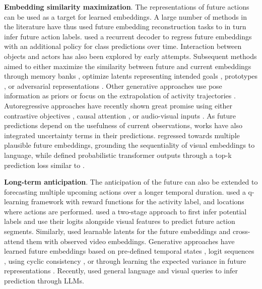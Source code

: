 \documentclass[smallextended,twocolumn,natbib]{svjour3}
\begin{document}
\noindent
\textbf{Embedding similarity maximization}. The representations of future actions can be used as a target for learned embeddings. A large number of methods in the literature have thus used future embedding reconstruction tasks to in turn infer future action labels. \citet{gao2017red} used a recurrent decoder to regress future embeddings with an additional policy for class predictions over time. Interaction between objects and actors \citep{sun2019relational,luc2018predicting} has also been explored by early attempts. 
Subsequent methods aimed to either maximize the similarity between future and current embeddings through memory banks \citep{liu2022hybrid},
optimize latents representing intended goals \citep{roy2022action}, prototypes \citep{diko2024semantically}, or adversarial representations \citep{gammulle2019predicting}. Other generative approaches use pose information as priors \citep{villegas2017learning} or focus on the extrapolation of activity trajectories \citep{chi2023adamsformer}.
Autoregressive approaches have recently shown great promise using either contrastive objectives \citep{wu2020learning}, causal attention \citep{girdhar2021anticipative}, or audio-visual inputs \citep{zhong2023anticipative}. As future predictions depend on the usefulness of current observations, works have also integrated uncertainty terms in their predictions. \citet{vondrick2016anticipating} regressed towards multiple plausible future embeddings, \citet{abdelsalam2023gepsan} grounding the sequentiality of visual embeddings to language, while \citet{guo2024uncertainty} defined probabilistic transformer outputs through a top-k prediction loss similar to \citep{furnari2018leveraging}.

\noindent
\textbf{Long-term anticipation}. The anticipation of the future can also be extended to forecasting multiple upcoming actions over a longer temporal duration. \citet{bokhari2017long} used a q-learning framework with reward functions for the activity label, and locations where actions are performed. \citet{nawhal2022rethinking} used a two-stage approach to first infer potential labels and use their logits alongside visual features to predict future action segments. Similarly, \citet{gong2022future} used learnable latents for the future embeddings and cross-attend \citep{jaegle2021perceiver,lee2019set} them with observed video embeddings. Generative approaches have learned future embeddings based on pre-defined temporal states \citep{piergiovanni2020adversarial}, logit sequences \citep{zhao2020diverse}, using cyclic consistency \citep{abu2021long}, or through learning the expected variance in future representations \citep{mascaro2023intention,patsch2024long}. Recently, \citet{mittal2024can} used general language and visual queries to infer prediction through LLMs.
\end{document}
